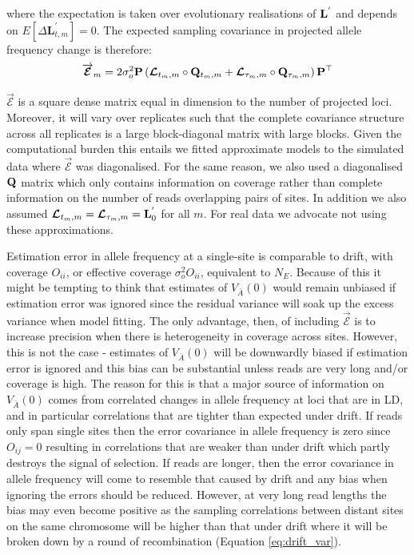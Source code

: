 \documentclass[12pt]{article}
\begin{document}
\begin{bibunit}
where the expectation is taken over evolutionary realisations of ${\bf L}^{'}$ and depends on $E[\Delta\boldsymbol{L}^{'}_{t,m}]=0$. The expected sampling covariance in projected allele frequency change is therefore:
\begin{equation}
\overrightarrow{\boldsymbol{\mathcal{E}}}_m = 2\sigma^2_o{\bf P}\left(\boldsymbol{\mathcal L}_{t_m,m}\circ{\bf Q}_{t_m,m}+\boldsymbol{\mathcal L}_{\tau_m,m}\circ{\bf Q}_{\tau_m,m}\right){\bf P}^{\top}
\end{equation}


$\overrightarrow{\boldsymbol{\mathcal{E}}}$ is a square dense matrix equal in dimension to the number of projected loci. Moreover, it will vary over replicates such that the complete covariance structure across all replicates is a large block-diagonal matrix with large blocks. Given the computational burden this entails we fitted approximate models to the simulated data where $\overrightarrow{\boldsymbol{\mathcal{E}}}$ was diagonalised. For the same reason, we also used a diagonalised ${\bf Q}$ matrix which only contains information on coverage rather than complete information on the number of reads overlapping pairs of sites. In addition we also assumed $\boldsymbol{\mathcal L}_{t_m,m}=\boldsymbol{\mathcal L}_{\tau_m,m}={\bf L}^{'}_0$ for all $m$. For real data we advocate not using these approximations.

Estimation error in allele frequency at a single-site is comparable to drift, with coverage $O_{ii}$, or effective coverage $\sigma^2_oO_{ii}$, equivalent to $N_E$. Because of this it might be tempting to think that estimates of $V_{\bar A}(0)$ would remain unbiased if estimation error was ignored since the residual variance will soak up the excess variance when model fitting. The only advantage, then, of including $\overrightarrow{\boldsymbol{\mathcal{E}}}$ is to increase precision when there is heterogeneity in coverage across sites. However, this is not the case - estimates of $V_{\bar A}(0)$ will be downwardly biased if estimation error is ignored and this bias can be substantial unless reads are very long and/or coverage is high.  The reason for this is that a major source of information on $V_{\bar A}(0)$ comes from correlated changes in allele frequency at loci that are in LD, and in particular correlations that are tighter than expected under drift. If reads only span single sites then the error covariance in allele frequency is zero since $O_{ij}=0$ resulting in correlations that are weaker than under drift which partly destroys the signal of selection. If reads are longer, then the error covariance in allele frequency will come to resemble that caused by drift and any bias when ignoring the errors should be reduced. However, at very long read lengths the bias may even become positive as the sampling correlations between distant sites on the same chromosome will be higher than that under drift where it will be broken down by a round of recombination (Equation \ref{eq:drift_var}). 


\end{bibunit}
\end{document}
